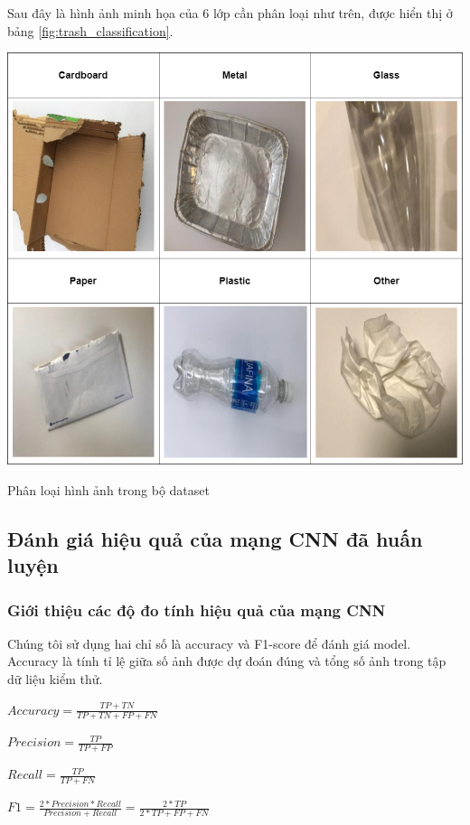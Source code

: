 Sau đây là hình ảnh minh họa của 6 lớp cần phân loại như trên, được hiển thị ở bảng \ref{fig:trash_classification}.
\begin{table}[H]
    \centering
    \includegraphics[width=\linewidth]{images/Quanh/Trash Classification.png}
    \caption{Phân loại hình ảnh trong bộ dataset}
    \label{fig:trash_classification}
\end{table}
\subsection{Đánh giá hiệu quả của mạng CNN đã huấn luyện}

\subsubsection{Giới thiệu các độ đo tính hiệu quả của mạng CNN} %
Chúng tôi sử dụng hai chỉ số là accuracy và F1-score để đánh giá model. Accuracy là tính tỉ lệ giữa số ảnh được dự đoán đúng và tổng số ảnh trong tập dữ liệu kiểm thử.

$Accuracy = \frac{TP+TN}{TP+TN+FP+FN}$

$Precision = \frac{TP}{TP+FP}$

$Recall = \frac{TP}{TP+FN}$

$F1 = \frac{2*Precision*Recall}  
{Precision+Recall} = \frac{2*TP}{2*TP+FP+FN}$
